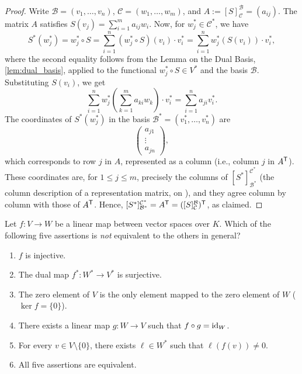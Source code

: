 \begin{proof}
  Write $\mathcal{B} = (v_1, \dots, v_n)$, $\mathcal{C} = (w_1, \dots, w_m)$, and $A := [S]_{\mathcal{C}}^{\mathcal{B}} = (a_{ij})$. The matrix $A$ satisfies $S(v_j) = \sum_{i=1}^m a_{ij} w_i$. Now, for $w_j^* \in \mathcal{C}^*$, we have
  \[ S^*(w_j^*) = w_j^* \circ S = \sum_{i=1}^n (w_j^* \circ S)(v_i) \cdot v_i^* = \sum_{i=1}^n w_j^*(S(v_i)) \cdot v_i^*, \]
  where the second equality follows from the Lemma on the Dual Basis, \cref{lem:dual_basis}, applied to the functional $w_j^* \circ S \in V^*$ and the basis $\mathcal{B}$. Substituting $S(v_i)$, we get
  \[ \sum_{i=1}^n w_j^*\left(\sum_{k=1}^m a_{ki} w_k\right) \cdot v_i^* = \sum_{i=1}^n a_{ji} v_i^*. \]
  The coordinates of $S^*(w_j^*)$ in the basis $\mathcal{B}^* = (v_1^*, \dots, v_n^*)$ are
  \[
  \begin{pmatrix} a_{j1} \\ \vdots \\ a_{jn} \end{pmatrix},
  \]
  which corresponds to row $j$ in $A$, represented as a column (i.e., column $j$ in $A^{\mathsf{T}}$).
  These coordinates are, for $1 \le j \le m$, precisely the columns of $[S^*]_{\mathcal{B}^*}^{\mathcal{C}^*}$ (the column description of a representation matrix, on ), and they agree column by column with those of $A^{\mathsf{T}}$. Hence, $[S^*]_{\mathcal{B}^*}^{\mathcal{C}^*} = A^{\mathsf{T}} = ([S]_{\mathcal{C}}^{\mathcal{B}})^{\mathsf{T}}$, as claimed.
\end{proof}

\begin{exercise}
\label{exc:dual_map_equivalences_sc}
Let $f \colon V \to W$ be a linear map between vector spaces over $K$. Which of the following five assertions is \emph{not} equivalent to the others in general?
\begin{enumerate}[label=\textbf{(\alph*)}]
    \item $f$ is injective.
    \item The dual map $f^* \colon W^* \to V^*$ is surjective.
    \item The zero element of $V$ is the only element mapped to the zero element of $W$ ($\ker f = \{0\}$).
    \item There exists a linear map $g \colon W \to V$ such that $f \circ g = \operatorname{id}_W$.
    \item For every $v \in V \setminus \{0\}$, there exists $\ell \in W^*$ such that $\ell(f(v)) \ne 0$.
    \item All five assertions are equivalent.
\end{enumerate}
\end{exercise}


